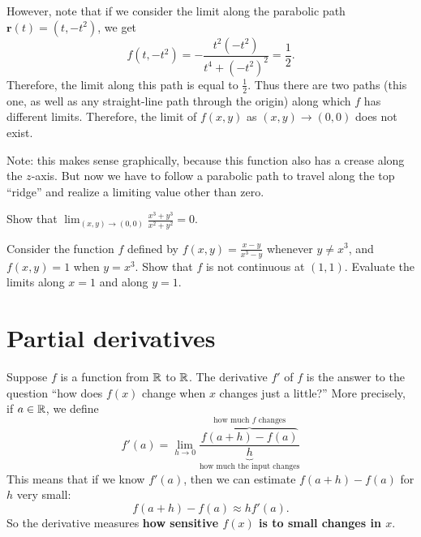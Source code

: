 \documentclass{watsonbook}
\begin{document}
\begin{solution}
  However, note that if we consider the limit along the parabolic
  path $\mathbf{r}(t) = (t, -t^2)$, we get
  \[
    f(t,-t^2) = -\frac{t^2(-t^2)}{t^4+(-t^2)^2} = \frac{1}{2}. 
  \]
  Therefore, the limit along this path is equal to
  $\tfrac{1}{2}$. Thus there are two paths (this one, as well as any
  straight-line path through the origin) along which $f$ has different
  limits. Therefore, the limit of $f(x,y)$ as $(x,y) \to (0,0)$ does
  not exist.
  
  Note: this makes sense graphically, because this function also has a
  crease along the $z$-axis. But now we have to follow a parabolic
  path to travel along the top ``ridge'' and realize a limiting value
  other than zero.
\end{solution}


\begin{exercise}{}{}
  Show that $\displaystyle{\lim_{(x,y) \to (0,0)} \frac{x^3 + y^3}{x^2 + y^2}} =
  0$. 
\end{exercise}

\begin{exercise}{}{}
  Consider the function $f$ defined by $f(x,y) = \frac{x-y}{x^3-y}$
  whenever $y \neq x^3$, and $f(x,y) = 1$ when $y = x^3$. Show that
  $f$ is not continuous at $(1,1)$. Evaluate the limits along 
  $x=1$ and along $y=1$.
\end{exercise}

\section{Partial derivatives} \label{sec:partial}



Suppose $f$ is a function from $\mathbb{R}$ to $\mathbb{R}$. The derivative $f'$ of
$f$ is the answer to the question ``how does $f(x)$ change when $x$
changes just a little?'' More precisely, if $a\in \mathbb{R}$, we define
\[
  f'(a) = \lim_{h \to 0} \frac{\overbrace{f(a+h)-f(a)}^{\text{how
        much $f$ changes}}}{\underbrace{h}_{\text{how much the input
        changes}}}
\]
This means that if we know $f'(a)$, then we can estimate
$f(a+h) - f(a)$ for $h$ very small:
\[
  f(a+h) - f(a) \approx h
  f'(a). 
\]
So the derivative measures \textbf{how sensitive $f(x)$ is to small
  changes in $x$}.
\end{document}
